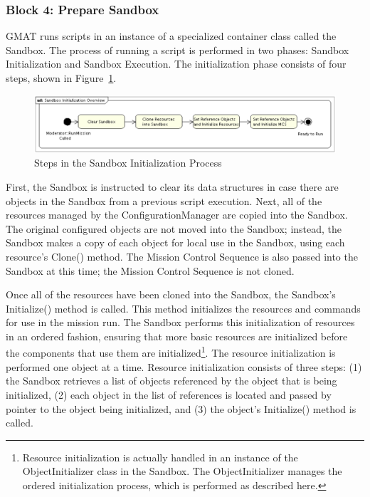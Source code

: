 \subsubsection{Block 4:  Prepare Sandbox}

GMAT runs scripts in an instance of a specialized container class called the Sandbox.  The process
of running a script is performed in two phases: Sandbox Initialization and Sandbox Execution.  The
initialization phase consists of four steps, shown in Figure~\ref{fig:SandboxInitialization}.

\begin{figure}[htbp]
\begin{center}
\includegraphics[scale=0.5]{Images/SandboxInitializationOverview.eps}
\caption{\label{fig:SandboxInitialization}Steps in the Sandbox Initialization Process}
\end{center}
\end{figure}

First, the Sandbox is instructed to clear its data structures in case there are objects in the Sandbox from a previous script execution.  Next, all of the resources managed by the
ConfigurationManager are copied into the Sandbox.  The original configured objects are not moved into the Sandbox; instead, the Sandbox makes a copy of each object for local use in the Sandbox, using each resource's Clone() method.  The Mission Control Sequence is also passed into the Sandbox at this time; the Mission Control Sequence is not cloned.

Once all of the resources have been cloned into the Sandbox, the Sandbox's Initialize() method is called.  This method initializes the resources and commands for use in the mission run.  The Sandbox performs this initialization of resources in an ordered fashion, ensuring that more basic resources are initialized before the components that use them are initialized\footnote{Resource initialization is actually handled in an instance of the ObjectInitializer class in the Sandbox.  The ObjectInitializer manages the ordered initialization process, which is performed as described here.}.  The resource initialization is performed one object at a time.  Resource initialization consists of three steps: (1) the Sandbox retrieves a list of objects referenced by the object that is being initialized, (2) each object in the list of references is located and passed by pointer to the object being initialized, and (3) the object's Initialize() method is called.

